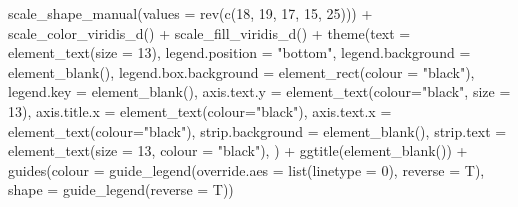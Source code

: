 \documentclass[
  letterpaper,
]{scrbook}
\newenvironment{Shaded}{\begin{snugshade}}{\end{snugshade}}
\newcommand{\AttributeTok}[1]{\textcolor[rgb]{0.40,0.45,0.13}{#1}}
\newcommand{\DecValTok}[1]{\textcolor[rgb]{0.68,0.00,0.00}{#1}}
\newcommand{\FunctionTok}[1]{\textcolor[rgb]{0.28,0.35,0.67}{#1}}
\newcommand{\NormalTok}[1]{\textcolor[rgb]{0.00,0.23,0.31}{#1}}
\newcommand{\SpecialCharTok}[1]{\textcolor[rgb]{0.37,0.37,0.37}{#1}}
\newcommand{\StringTok}[1]{\textcolor[rgb]{0.13,0.47,0.30}{#1}}
\begin{document}
\begin{Shaded}
\begin{Highlighting}[]
  \FunctionTok{scale\_shape\_manual}\NormalTok{(}\AttributeTok{values =} \FunctionTok{rev}\NormalTok{(}\FunctionTok{c}\NormalTok{(}\DecValTok{18}\NormalTok{, }\DecValTok{19}\NormalTok{, }\DecValTok{17}\NormalTok{, }\DecValTok{15}\NormalTok{, }\DecValTok{25}\NormalTok{))) }\SpecialCharTok{+}
  \FunctionTok{scale\_color\_viridis\_d}\NormalTok{() }\SpecialCharTok{+}
  \FunctionTok{scale\_fill\_viridis\_d}\NormalTok{() }\SpecialCharTok{+}
  \FunctionTok{theme}\NormalTok{(}\AttributeTok{text =} \FunctionTok{element\_text}\NormalTok{(}\AttributeTok{size =} \DecValTok{13}\NormalTok{),}
                         \AttributeTok{legend.position =} \StringTok{"bottom"}\NormalTok{,}
                         \AttributeTok{legend.background =} \FunctionTok{element\_blank}\NormalTok{(),}
                         \AttributeTok{legend.box.background =} \FunctionTok{element\_rect}\NormalTok{(}\AttributeTok{colour =} \StringTok{"black"}\NormalTok{),}
                         \AttributeTok{legend.key =} \FunctionTok{element\_blank}\NormalTok{(),}
                         \AttributeTok{axis.text.y =} \FunctionTok{element\_text}\NormalTok{(}\AttributeTok{colour=}\StringTok{"black"}\NormalTok{, }\AttributeTok{size =} \DecValTok{13}\NormalTok{),}
                         \AttributeTok{axis.title.x =} \FunctionTok{element\_text}\NormalTok{(}\AttributeTok{colour=}\StringTok{"black"}\NormalTok{),}
                         \AttributeTok{axis.text.x =} \FunctionTok{element\_text}\NormalTok{(}\AttributeTok{colour=}\StringTok{"black"}\NormalTok{),}
                         \AttributeTok{strip.background =} \FunctionTok{element\_blank}\NormalTok{(),}
                         \AttributeTok{strip.text =} \FunctionTok{element\_text}\NormalTok{(}\AttributeTok{size =} \DecValTok{13}\NormalTok{, }\AttributeTok{colour =} \StringTok{"black"}\NormalTok{),}
\NormalTok{) }\SpecialCharTok{+}
  \FunctionTok{ggtitle}\NormalTok{(}\FunctionTok{element\_blank}\NormalTok{()) }\SpecialCharTok{+}
  \FunctionTok{guides}\NormalTok{(}\AttributeTok{colour =} \FunctionTok{guide\_legend}\NormalTok{(}\AttributeTok{override.aes =} \FunctionTok{list}\NormalTok{(}\AttributeTok{linetype =} \DecValTok{0}\NormalTok{), }\AttributeTok{reverse =}\NormalTok{ T),}
                          \AttributeTok{shape =} \FunctionTok{guide\_legend}\NormalTok{(}\AttributeTok{reverse =}\NormalTok{ T))}
\end{Highlighting}
\end{Shaded}
\end{document}

